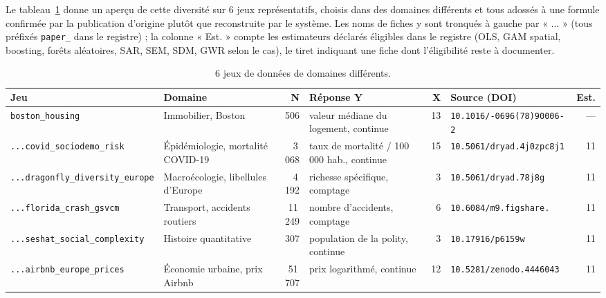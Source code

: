 \documentclass[11pt,a4paper]{article}
\begin{document}
Le tableau~\ref{tab:jeux-diversite} donne un aperçu de cette diversité sur 6 jeux représentatifs, choisis dans des domaines différents et tous adossés à une formule confirmée par la publication d'origine plutôt que reconstruite par le système. Les noms de fiches y sont tronqués à gauche par « ... » (tous préfixés \texttt{paper\_} dans le registre) ; la colonne « Est. » compte les estimateurs déclarés éligibles dans le registre (OLS, GAM spatial, boosting, forêts aléatoires, SAR, SEM, SDM, GWR selon le cas), le tiret indiquant une fiche dont l'éligibilité reste à documenter.

\begin{table}[ht]
\centering
\small
\begin{tabular}{@{}p{2.6cm}p{2.1cm}rp{3.5cm}rp{3.1cm}r@{}}
\toprule
Jeu & Domaine & N & Réponse Y & X & Source (DOI) & Est. \\
\midrule
\texttt{boston\_\allowbreak housing} & Immobilier, Boston & 506 & valeur médiane du logement, continue & 13 & \scriptsize\texttt{10.1016/\allowbreak 0095-0696(78)90006-2} & --- \\[0.15cm]
\texttt{...covid\_\allowbreak sociodemo\_\allowbreak risk} & Épidémiologie, mortalité COVID-19 & 3\,068 & taux de mortalité / 100\,000 hab., continue & 15 & \scriptsize\texttt{10.5061/\allowbreak dryad.4j0zpc8j1} & 11 \\[0.15cm]
\texttt{...dragonfly\_\allowbreak diversity\_\allowbreak europe} & Macroécologie, libellules d'Europe & 4\,192 & richesse spécifique, comptage & 3 & \scriptsize\texttt{10.5061/dryad.78j8g} & 11 \\[0.15cm]
\texttt{...florida\_\allowbreak crash\_\allowbreak gsvcm} & Transport, accidents routiers & 11\,249 & nombre d'accidents, comptage & 6 & \scriptsize\texttt{10.6084/\allowbreak m9.figshare.\allowbreak 12156975} & 11 \\[0.15cm]
\texttt{...seshat\_\allowbreak social\_\allowbreak complexity} & Histoire quantitative & 307 & population de la polity, continue & 3 & \scriptsize\texttt{10.17916/p6159w} & 11 \\[0.15cm]
\texttt{...airbnb\_\allowbreak europe\_\allowbreak prices} & Économie urbaine, prix Airbnb & 51\,707 & prix logarithmé, continue & 12 & \scriptsize\texttt{10.5281/\allowbreak zenodo.4446043} & 11 \\
\bottomrule
\end{tabular}
\caption{6 jeux de données de domaines différents.}
\label{tab:jeux-diversite}
\end{table}
\end{document}

